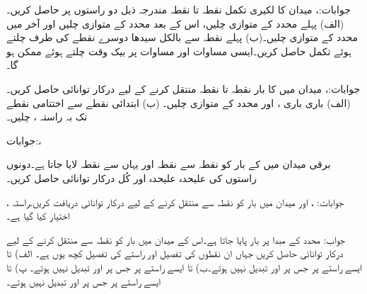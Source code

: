 جوابات:، 
میدان  کا لکیری تکمل  نقطہ  تا نقطہ  مندرجہ ذیل دو راستوں پر حاصل کریں۔(الف) پہلے  محدد کے متوازی چلیں، اس کے بعد  محدد کے متوازی چلیں اور آخر میں  محدد کے متوازی چلیں۔(ب) پہلے نقطہ سے بالکل سیدھا دوسرے نقطے کی طرف چلتے ہوئے تکمل حاصل کریں۔ایسی مساوات  اور مساوات  پر بیک وقت چلتے ہوئے ممکن ہو گا۔ 

جوابات:، 
میدان  میں  کا بار نقطہ  تا نقطہ  منتقل کرنے کے لیے درکار توانائی حاصل کریں۔(الف) باری باری ،  اور  محدد کے متوازی چلیں۔ (ب) ابتدائی نقطے سے اختتامی نقطے تک بہ راستہ ،  چلیں۔

جوابات:، 

برقی میدان  میں  کے بار کو نقطہ  سے نقطہ  اور  یہاں سے نقطہ  لایا جاتا ہے۔دونوں راستوں کی علیحدہ علیحدہ اور کُل درکار توانائی حاصل کریں۔

جوابات: ،  اور 
میدان  میں بار  کو نقطہ  سے  منتقل کرنے کے لیے درکار توانائی دریافت کریں۔راستہ ،  اختیار کیا گیا ہے۔

جواب:
محدد کے مبدا پر  بار پایا جاتا ہے۔اس کے میدان میں بار  کو نقطہ  سے  منتقل کرنے کے لیے درکار توانائی حاصل کریں جہاں ان نقطوں کی تفصیل اور راستے کی تفصیل کچھ یوں ہے۔ الف)  تا  ایسے راستے پر جس پر  اور  تبدیل نہیں ہوتے۔ب)  تا  ایسے راستے پر جس پر  اور  تبدیل نہیں ہوتے۔ پ)  تا  ایسے راستے پر جس پر  اور  تبدیل نہیں ہوتے۔

